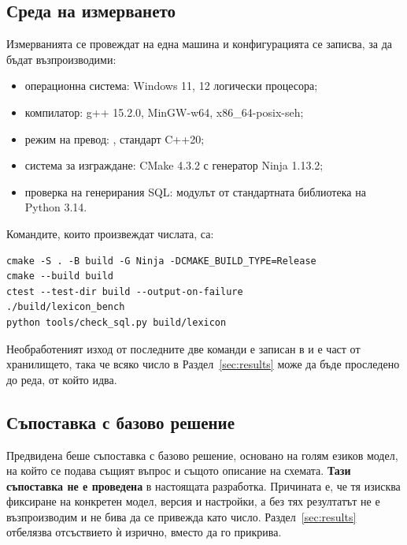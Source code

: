 \subsection{Среда на измерването}

Измерванията се провеждат на една машина и конфигурацията се записва, за да бъдат
възпроизводими:

\begin{itemize}[topsep=0pt,itemsep=0pt,leftmargin=*]
\item операционна система: Windows 11, 12 логически процесора;
\item компилатор: g++ 15.2.0, MinGW-w64, x86\_64-posix-seh;
\item режим на превод: , стандарт C++20;
\item система за изграждане: CMake 4.3.2 с генератор Ninja 1.13.2;
\item проверка на генерирания SQL: модулът  от стандартната библиотека на
      Python 3.14.
\end{itemize}

Командите, които произвеждат числата, са:

\begin{verbatim}
cmake -S . -B build -G Ninja -DCMAKE_BUILD_TYPE=Release
cmake --build build
ctest --test-dir build --output-on-failure
./build/lexicon_bench
python tools/check_sql.py build/lexicon
\end{verbatim}

Необработеният изход от последните две команди е записан в
 и е част от хранилището, така че всяко число в
Раздел~\ref{sec:results} може да бъде проследено до реда, от който идва.

\subsection{Съпоставка с базово решение}

Предвидена беше съпоставка с базово решение, основано на голям езиков модел, на който се
подава същият въпрос и същото описание на схемата. \textbf{Тази съпоставка не е
проведена} в настоящата разработка. Причината е, че тя изисква фиксиране на конкретен
модел, версия и настройки, а без тях резултатът не е възпроизводим и не бива да се
привежда като число. Раздел~\ref{sec:results} отбелязва отсъствието ѝ изрично, вместо да
го прикрива. 

